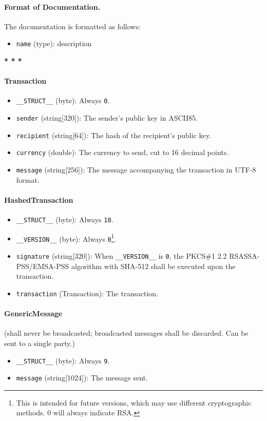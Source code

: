 \documentclass{article}
\begin{document}
{\paragraph{Format of Documentation.} The documentation is formatted as follows:
\begin{itemize}
	\item \verb|name| (type): description
\end{itemize}

\begin{center}
	{\bf{* * *}}
\end{center}

\paragraph{Transaction}
\begin{itemize}
	\item \verb|__STRUCT__| (byte): Always \verb|0|.
	\item \verb|sender| (string[320]): The sender's public key
		in ASCII85.
	\item \verb|recipient| (string[64]): The hash of
		the recipient's public key.
	\item \verb|currency| (double): The currency to send, cut to
		16 decimal points.
	\item \verb|message| (string[256]): The message accompanying
		the transaction in UTF-8 format.
\end{itemize}

\paragraph{HashedTransaction}
\begin{itemize}
	\item \verb|__STRUCT__| (byte): Always \verb|10|.
	\item \verb|__VERSION__| (byte): Always \verb|0|\footnote{
			This is intended for future versions, which may use different
			cryptographic methods. 0 will always indicate RSA.
		}.
	\item \verb|signature| (string[320]): When \verb|__VERSION__| is
		\verb|0|, the PKCS\#1 2.2 RSASSA-PSS/EMSA-PSS algorithm with SHA-512
		shall be executed upon the transaction.
	\item \verb|transaction| (Transaction): The transaction.
\end{itemize}

\paragraph{GenericMessage} (shall never be broadcasted; broadcasted messages
shall be discarded. Can be sent to a single party.)
\begin{itemize}
	\item \verb|__STRUCT__| (byte): Always \verb|9|.
	\item \verb|message| (string[1024]): The message sent.
\end{itemize}

}
\end{document}
